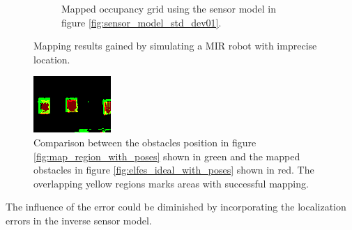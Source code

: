 \begin{figure}[htbp]
\begin{subfigure}[t]{0.45\textwidth}
		\caption{Mapped occupancy grid using the sensor model in figure \vref{fig:sensor_model_std_dev01}.}
		\label{fig:elfes_ideal_with_poses}
	\end{subfigure}
	\caption{Mapping results gained by simulating a MIR robot with imprecise location.}
	\label{fig:simulated_location_error}
\end{figure}

\begin{figure}[htbp]
	\centering
	\includegraphics[width=0.5\linewidth]{figures/static_mapping/elfes_ideal_no_decay}
	\caption{Comparison between the obstacles position in figure  \vref{fig:map_region_with_poses} shown in green and the mapped obstacles in figure \vref{fig:elfes_ideal_with_poses} shown in red. The overlapping yellow regions marks areas with successful mapping.}
	\label{fig:elfes_compare}
\end{figure}

The influence of the error could be diminished by incorporating the localization errors in the inverse sensor model.